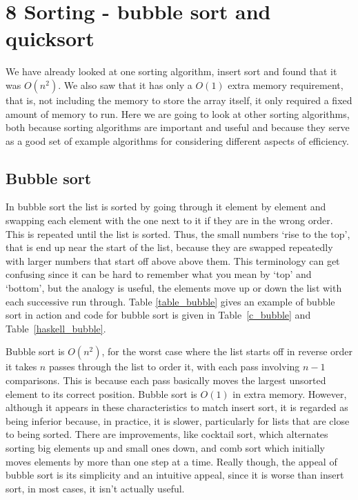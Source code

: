\documentclass[11pt,a4paper]{scrartcl}
\begin{document}
\section*{8 Sorting - bubble sort and quicksort}

We have already looked at one sorting algorithm, insert sort and found
that it was $O(n^2)$. We also saw that it has only a $O(1)$ extra memory
requirement, that is, not including the memory to store the array
itself, it only required a fixed amount of memory to run. Here we are
going to look at other sorting algorithms, both because sorting
algorithms are important and useful and because they serve as a good
set of example algorithms for considering different aspects of
efficiency.

\subsection*{Bubble sort}

In bubble sort the list is sorted by going through it element by
element and swapping each element with the one next to it if they are
in the wrong order. This is repeated until the list is sorted. Thus,
the small numbers \lq{}rise to the top\rq{}, that is end up near the
start of the list, because they are swapped repeatedly with larger
numbers that start off above above them. This terminology can get
confusing since it can be hard to remember what you mean by
\lq{}top\rq{} and \lq{}bottom\rq{}, but the analogy is useful, the
elements move up or down the list with each successive run
through. Table \ref{table_bubble} gives an example of bubble sort in
action and code for bubble sort is given in Table~\ref{c_bubble} and
Table~\ref{haskell_bubble}.

Bubble sort is $O(n^2)$, for the worst case where the list starts off
in reverse order it takes $n$ passes through the list to order it,
with each pass involving $n-1$ comparisons. This is because each pass
basically moves the largest unsorted element to its correct
position. Bubble sort is $O(1)$ in extra memory. However, although it
appears in these characteristics to match insert sort, it is regarded
as being inferior because, in practice, it is slower, particularly for
lists that are close to being sorted. There are improvements, like
cocktail sort, which alternates sorting big elements up and small ones
down, and comb sort which initially moves elements by more than one
step at a time. Really though, the appeal of bubble sort is its
simplicity and an intuitive appeal, since it is worse than insert
sort, in most cases, it isn't actually useful.
\end{document}

